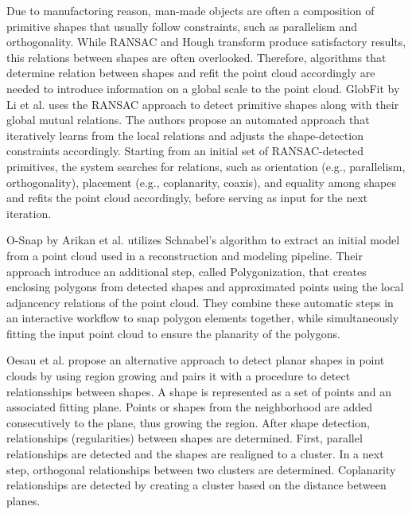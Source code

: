 \par

Due to manufactoring reason, man-made objects are often a composition of primitive shapes that usually follow constraints, such as parallelism and orthogonality. 
While RANSAC and Hough transform produce satisfactory results, this relations between shapes are often overlooked. Therefore, algorithms that determine relation between shapes and refit the point cloud accordingly are needed to introduce information on a global scale to the point cloud. 
GlobFit by Li et al. \cite{li2011globfit} uses the RANSAC approach to detect primitive shapes along with their global mutual relations. The authors propose an automated approach that iteratively learns from the local relations and adjusts the shape-detection constraints accordingly. Starting from an initial set of RANSAC-detected primitives, the system searches for relations, such as orientation (e.g., parallelism, orthogonality), placement (e.g., coplanarity, coaxis), and equality among shapes and refits the point cloud accordingly, before serving as input for the next iteration. 

\par

O-Snap by Arikan et al. \cite{arikan-2013-osn} utilizes Schnabel's algorithm to extract an initial model from a point cloud used in a reconstruction and modeling pipeline. Their approach introduce an additional step, called Polygonization, that creates enclosing polygons from detected shapes and approximated points using the local adjancency relations of the point cloud. They combine these automatic steps in an interactive workflow to snap polygon elements together, while simultaneously fitting the input point cloud to ensure the planarity of the polygons. 

\par

Oesau et al. \cite{oesau2016planar} propose an alternative approach to detect planar shapes in point clouds by using region growing and pairs it with a procedure to detect relationsships between shapes. A shape is represented as a set of points and an associated fitting plane. Points or shapes from the neighborhood are added consecutively to the plane, thus growing the region. After shape detection, relationships (regularities) between shapes are determined. First, parallel relationships are detected and the shapes are realigned to a cluster. In a next step, orthogonal relationships between two clusters are determined. Coplanarity relationships are detected by creating a cluster based on the distance between planes. 
